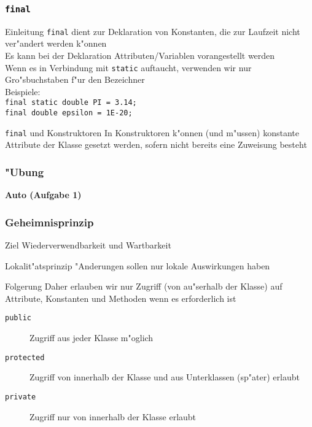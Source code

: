 \documentclass{beamer}
\begin{document}
\begin{frame}
\frametitle{\texttt{final}}
\begin{block}{Einleitung}
\texttt{final} dient zur Deklaration von Konstanten, die zur Laufzeit nicht ver"andert werden k"onnen\\
Es kann bei der Deklaration Attributen/Variablen vorangestellt werden\\
Wenn es in Verbindung mit \texttt{static} auftaucht, verwenden wir nur Gro"sbuchstaben f"ur den Bezeichner\\
Beispiele:\\
\lstinline|final static double PI = 3.14;|\\
\lstinline|final double epsilon = 1E-20;|
\end{block}

\pause

\begin{block}{\texttt{final} und Konstruktoren}
In Konstruktoren k"onnen (und m"ussen) konstante Attribute der Klasse gesetzt werden, sofern nicht bereits eine Zuweisung besteht
\end{block}
\end{frame}


\begin{frame}
\frametitle{"Ubung}
\begin{center}
\textbf{\Huge Auto (Aufgabe 1)}
\end{center}
\end{frame}


\begin{frame}
\frametitle{Geheimnisprinzip}
\begin{block}{Ziel}
Wiederverwendbarkeit und Wartbarkeit
\end{block}

\pause

\begin{block}{Lokalit"atsprinzip}
"Anderungen sollen nur lokale Auswirkungen haben
\end{block}

\pause

\begin{block}{Folgerung}
Daher erlauben wir nur Zugriff (von au"serhalb der Klasse) auf Attribute, Konstanten und Methoden wenn es erforderlich ist
\begin{description}
\item[\texttt{public}] Zugriff aus jeder Klasse m"oglich
\item[\texttt{protected}] Zugriff von innerhalb der Klasse und aus Unterklassen (sp"ater) erlaubt
\item[\texttt{private}] Zugriff nur von innerhalb der Klasse erlaubt
\end{description}
\end{block}
\end{frame}
\end{document}
